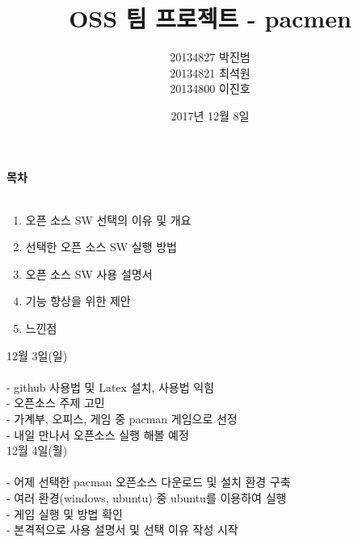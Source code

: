 \documentclass{article}
\begin{document}
\title{\textbf{OSS 팀 프로젝트 - pacmen}}
\author {20134827 박진범\\20134821 최석원\\20134800 이진호}
\date{2017년 12월 8일}
\maketitle



\newpage
\textbf{목차}\\\\
\begin{enumerate}
\item 오픈 소스 SW 선택의 이유 및 개요 \\
\item 선택한 오픈 소스 SW 실행 방법 \\
\item 오픈 소스 SW 사용 설명서\\
\item 기능 향상을 위한 제안\\
\item 느낀점
\end{enumerate}

\newpage
12월 3일(일)\\\\

- github 사용법 및 Latex 설치, 사용법 익힘\\

- 오픈소스 주제 고민\\

- 가계부, 오피스, 게임 중 pacman 게임으로 선정\\

- 내일 만나서 오픈소스 실행 해볼 예정\\


12월 4일(월)\\\\

- 어제 선택한 pacman 오픈소스 다운로드 및 설치 환경 구축\\

- 여러 환경(windows, ubuntu) 중 ubuntu를 이용하여 실행\\

- 게임 실행 및 방법 확인\\

- 본격적으로 사용 설명서 및 선택 이유 작성 시작\\
\end{document}
